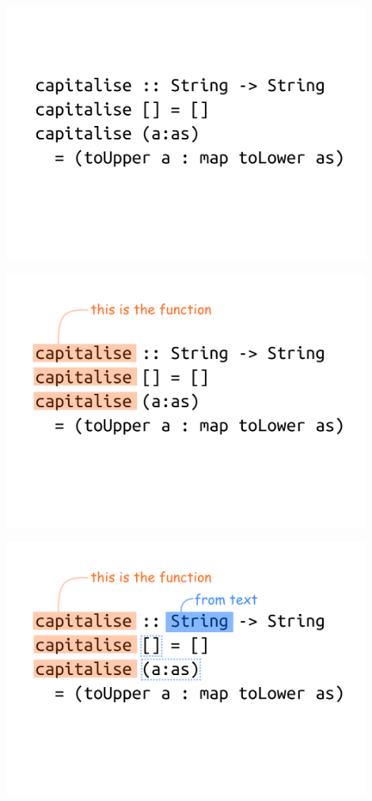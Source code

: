 \documentclass[xcolor={table}]{beamer}
\begin{document}
\begin{frame}{}{}

    \centering
    \includegraphics[width=0.9\textwidth]{images/haskell-code-01.png}

\end{frame}

\begin{frame}{}{}

    \centering
    \includegraphics[width=0.9\textwidth]{images/haskell-code-02.png}

\end{frame}

\begin{frame}{}{}

    \centering
    \includegraphics[width=0.9\textwidth]{images/haskell-code-03.png}

\end{frame}
\end{document}

